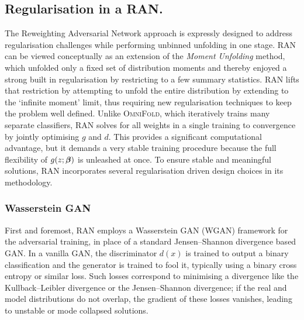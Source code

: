 {{    \subsection{Regularisation in a RAN.}
    \label{subsec:regularisation-in-ran}
        The Reweighting Adversarial Network approach is expressly designed to address regularisation challenges while performing unbinned unfolding in one stage.
        RAN can be viewed conceptually as an extension of the \emph{Moment Unfolding} method, which unfolded only a fixed set of distribution moments and thereby enjoyed a strong built in regularisation by restricting to a few summary statistics.
        RAN lifts that restriction by attempting to unfold the entire distribution by extending to the `infinite moment' limit, thus requiring new regularisation techniques to keep the problem well defined.
        Unlike \textsc{OmniFold}, which iteratively trains many separate classifiers, RAN solves for all weights in a single training to convergence by jointly optimising $g$ and $d$.
        This provides a significant computational advantage, but it demands a very stable training procedure because the full flexibility of $g(z; \vb*\beta)$ is unleashed at once.
        To ensure stable and meaningful solutions, RAN incorporates several regularisation driven design choices in its methodology.
        
        \subsubsection{Wasserstein GAN}
            First and foremost, RAN employs a {Wasserstein GAN (WGAN)} framework for the adversarial training, in place of a standard Jensen--Shannon divergence based GAN.
            In a vanilla GAN, the discriminator $d(x)$ is trained to output a binary classification and the generator is trained to fool it, typically using a binary cross entropy or similar loss.
            Such losses correspond to minimising a divergence like the Kullback--Leibler divergence or the Jensen--Shannon divergence; if the real and model distributions do not overlap, the gradient of these losses vanishes, leading to unstable or mode collapsed solutions.
            
}}
